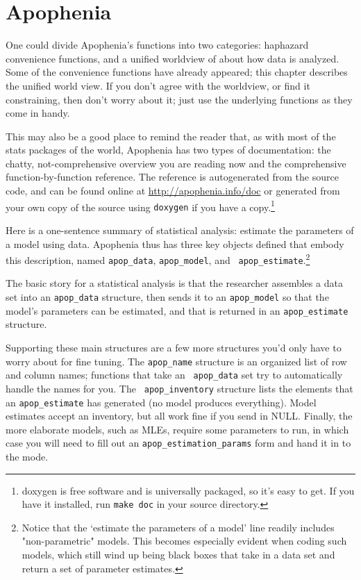 \chapter{Apophenia}

One could divide Apophenia's functions into two categories: haphazard
convenience functions, and a unified worldview of about how data is
analyzed. Some of the convenience functions have already appeared; this
chapter describes the unified world view. If you don't agree with the
worldview, or find it constraining, then don't worry about it; just use
the underlying functions as they come in handy.

This may also be a good place to remind the reader that, as with most of
the stats packages of the world, Apophenia has two types of
documentation: the chatty, not-comprehensive overview you are reading now and the
comprehensive function-by-function reference. The reference is autogenerated from the
source code, and can be found online at \url{http://apophenia.info/doc}
or generated from your own copy of the source using {\tt doxygen} if you
have a copy.\footnote{doxygen is free software and is universally packaged,
so it's easy to get. If you have it installed, run {\tt make doc} in
your source directory.}

Here is a one-sentence summary of statistical analysis: estimate the
parameters of a model
using data. Apophenia thus has three key objects defined that embody
this description, named {\tt apop\_data}, {\tt apop\_model}, and {\tt
apop\_estimate}.\footnote{Notice that the `estimate the parameters of a
model' line readily includes "non-parametric" models. This becomes
especially evident when coding such models, which still wind up being
black boxes that take in a data set and return a set of parameter
estimates.}

The basic story for a statistical analysis is that the researcher
assembles a data set into an {\tt apop\_data} structure, then sends it to
an {\tt apop\_model} so that the model's parameters can be estimated,
and that is returned in an {\tt apop\_estimate} structure.

Supporting these main structures are a few more structures you'd only
have to worry about for fine tuning.  The {\tt apop\_name} structure is
an organized list of row and column names; functions that take an {\tt
apop\_data} set try to automatically handle the names for you.  The {\tt
apop\_inventory} structure lists the elements that an {\tt apop\_estimate}
has generated (no model produces everything). Model estimates accept
an inventory, but all work fine if you send in NULL. Finally, the more
elaborate models, such as MLEs, require some parameters to run, in
which case you will need to fill out an {\tt apop\_estimation\_params}
form and hand it in to the mode.



